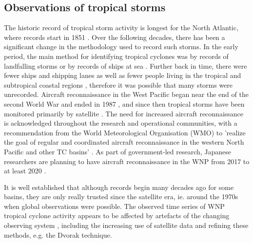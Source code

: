 

\subsection{Observations of tropical storms}
The historic record of tropical storm activity is longest for the North Atlantic, where records start in 1851 \citep{landsea2004atlantic}. Over the following decades, there has been a significant change in the methodology used to record such storms. In the early period, the main method for identifying tropical cyclones was by records of landfalling storms or by records of ships at sea \citep{vecchi2008estimates}. Further back in time, there were fewer ships and shipping lanes as well as fewer people living in the tropical and subtropical coastal regions \citep{landsea2007counting}, therefore it was possible that many storms were unrecorded. Aircraft reconnaissance in the West Pacific began near the end of the second World War and ended in 1987 \citep{knapp2013pressure}, and since then tropical storms have been monitored primarily by satellite \citep{lander1994exploratory}. The need for increased aircraft reconnaissance is acknowledged throughout the research and operational communities, with a recommendation from the World Meteorological Organisation (WMO) to 'realize the goal of regular and coordinated aircraft reconnaissance in the western North Pacific and other TC basins' \citep{wmoitwc8}. As part of government-led research, Japanese researchers are planning to have aircraft reconnaissance in the WNP from 2017 to at least 2020 \citep{nhkhurricanehunter}.


It is well established that although records begin many decades ago for some basins, they are only really trusted since the satellite era, ie. around the 1970s \citep{landsea2007counting} when global observations were possible. The observed time series of WNP tropical cyclone activity appears to be affected by artefacts of the changing observing system  \citep{lander1994exploratory, knapp2013pressure}, including the increasing use of satellite data and refining these methods, e.g. the Dvorak technique.

